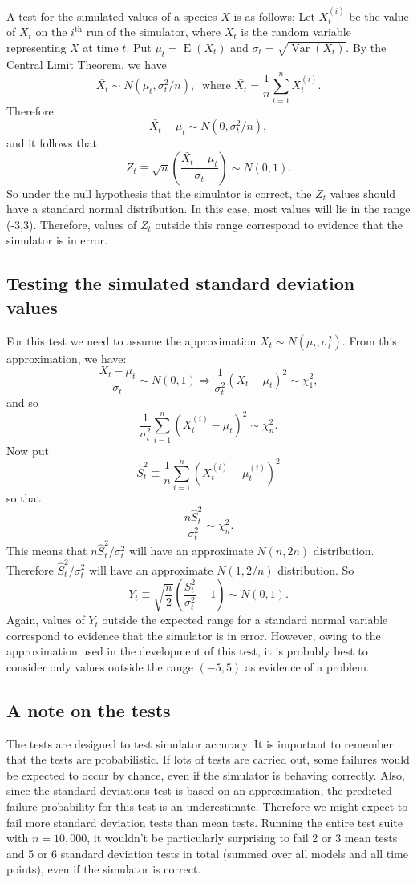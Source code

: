 \documentclass[12pt,a4paper]{article}
\begin{document}
A test for the simulated values of a species $X$ is as follows: Let
$X_t^{(i)}$ be the value of $X_t$ on the $i^{\mbox{th}}$ run of the
simulator, where $X_t$ is the random variable representing $X$ at time
$t$. Put $\mu_t=\operatorname{E}(X_t)$ and
$\sigma_t=\sqrt{\operatorname{Var}(X_t)}$. By the Central Limit
Theorem, we have
\[
\bar{X_t} \sim N( \mu_t, \sigma_t^2/n ),\ 
\text{ where }
\bar{X_t}=\frac{1}{n}\sum_{i=1}^n X_t^{(i)}.
\]
Therefore
\[
\bar{X_t}-\mu_t \sim N(0,\sigma_t^2/n),
\]
and it follows that
\[
Z_t \equiv \sqrt{n}\left( \frac{\bar{X_t} -\mu_t}{\sigma_t}\right)\sim N(0,1).
\]
So under the null hypothesis that the simulator is correct, the $Z_t$
values should have a standard normal distribution. In this case, most
values will lie in the range (-3,3). Therefore, values of $Z_t$
outside this range correspond to evidence that the simulator is in
error.

\subsection{Testing the simulated standard deviation values}

For this test we need to assume the approximation $X_t\sim
N(\mu_t,\sigma_t^2)$. From this approximation, we have:
\[
\frac{X_t-\mu_t}{\sigma_t} \sim N(0,1) \Rightarrow\frac{1}{\sigma_t^2}(X_t-\mu_t)^2 \sim \chi^2_1,
\]
and so
\[
\frac{1}{\sigma_t^2}\sum_{i=1}^n (X_t^{(i)}-\mu_t)^2 \sim \chi^2_n.
\]
Now put
\[
\hat{S}_t^2 \equiv \frac{1}{n}\sum_{i=1}^n(X_t^{(i)}-\mu_t^{(i)})^2
\]
so that
\[
\frac{n\hat{S}_t^2}{\sigma_t^2} \sim \chi^2_n.
\]
This means that $n\hat{S}_t^2/\sigma_t^2$ will have an approximate
$N(n,2n)$ distribution. Therefore $\hat{S}_t^2/\sigma_t^2$ will have
an approximate $ N(1,2/n)$ distribution. So
\[
Y_t \equiv \sqrt{\frac{n}{2}}\left(\frac{S_t^2}{\sigma_t^2} - 1\right)\sim N(0,1).
\]
Again, values of $Y_t$ outside the expected range for a standard
normal variable correspond to evidence that the simulator is in
error. However, owing to the approximation used in the development of
this test, it is probably best to consider only values outside the
range $(-5,5)$ as evidence of a problem.

\subsection{A note on the tests}

The tests are designed to test simulator accuracy. It is important to
remember that the tests are probabilistic. If lots of tests are
carried out, some failures would be expected to occur by chance, even
if the simulator is behaving correctly. Also, since the standard
deviations test is based on an approximation, the predicted failure
probability for this test is an underestimate. Therefore we might
expect to fail more standard deviation tests than mean tests. Running
the entire test suite with $n=10,000$, it wouldn't be particularly
surprising to fail 2 or 3 mean tests and 5 or 6 standard deviation
tests in total (summed over all models and all time points), even if
the simulator is correct.
\end{document}
